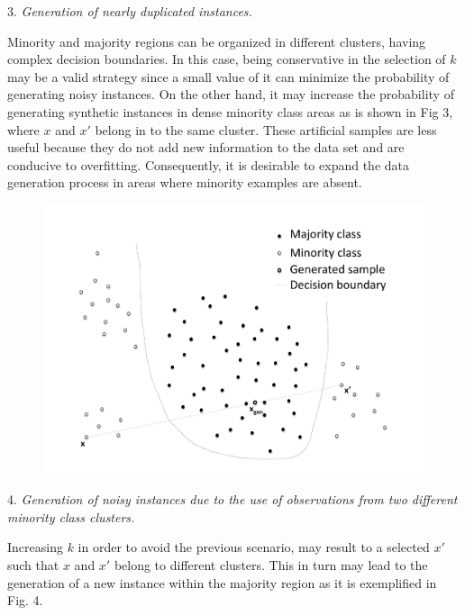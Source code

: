 \documentclass[parskip=full]{scrartcl}
\begin{document}
3. \textit{Generation of nearly duplicated instances.}

Minority and majority regions can be organized in different clusters, having
complex decision boundaries.  In this case, being conservative in the selection
of \( k \) may be a valid strategy since a small value of it can minimize the
probability of generating noisy instances. On the other hand, it may increase
the probability of generating synthetic instances in dense minority class areas
as is shown in Fig 3, where \(x\) and \(x'\) belong in to the same cluster.
These artificial samples are less useful because they do not add new information
to the data set and are conducive to overfitting. Consequently, it is desirable
to expand the data generation process in areas where minority examples are
absent.

\begin{figure}[H]
	\centering
	\includegraphics[width=12cm, keepaspectratio]{./artifacts/fig3}
	\end{figure}

4. \textit{Generation of noisy instances due to the use of observations from two
different minority class clusters.}

Increasing \( k \)  in order to avoid the previous scenario,  may result to a
selected \( x' \) such that \( x \) and \( x' \) belong to different clusters.
This in turn may lead to the generation of a new instance within the majority
region as it is exemplified in Fig. 4. 
\end{document}
